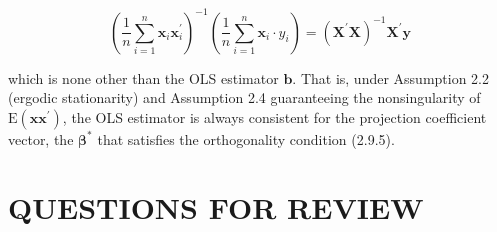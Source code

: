\documentclass[10pt]{article}
\begin{document}
$$
\left(\frac{1}{n} \sum_{i=1}^{n} \mathbf{x}_{i} \mathbf{x}_{i}^{\prime}\right)^{-1}\left(\frac{1}{n} \sum_{i=1}^{n} \mathbf{x}_{i} \cdot y_{i}\right)=\left(\mathbf{X}^{\prime} \mathbf{X}\right)^{-1} \mathbf{X}^{\prime} \mathbf{y}
$$

which is none other than the OLS estimator $\mathbf{b}$. That is, under Assumption 2.2 (ergodic stationarity) and Assumption 2.4 guaranteeing the nonsingularity of $\mathrm{E}\left(\mathbf{x x}^{\prime}\right)$, the OLS estimator is always consistent for the projection coefficient vector, the $\boldsymbol{\beta}^{*}$ that satisfies the orthogonality condition (2.9.5).

\section*{QUESTIONS FOR REVIEW}
\end{document}
